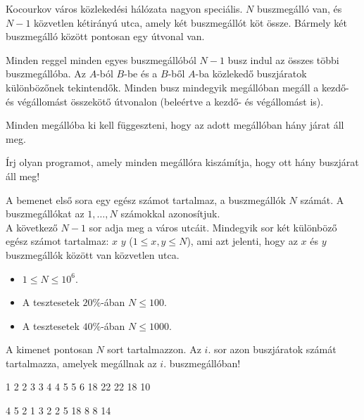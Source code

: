 





Kocourkov város közlekedési hálózata nagyon speciális. $N$ buszmegálló van, és $N-1$ közvetlen kétirányú utca, amely két buszmegállót köt össze. Bármely két buszmegálló között pontosan egy útvonal van.

Minden reggel minden egyes buszmegállóból $N-1$ busz indul az összes többi buszmegállóba. Az $A$-ból $B$-be és a $B$-ből $A$-ba közlekedő buszjáratok különbözőnek tekintendők. Minden busz mindegyik megállóban megáll a kezdő- és végállomást összekötő útvonalon (beleértve a kezdő- és végállomást is).

Minden megállóba ki kell függeszteni, hogy az adott megállóban hány járat áll meg.


Írj olyan programot, amely minden megállóra kiszámítja, hogy ott hány buszjárat áll meg!


A bemenet első sora egy egész számot tartalmaz, a buszmegállók $N$ számát. A buszmegállókat az $1,\ldots,N$ számokkal azonosítjuk.\\
A következő $N-1$ sor adja meg a város utcáit. Mindegyik sor két különböző egész számot tartalmaz: $x \,\, y$  ($1 \le x, y \le N$), ami azt jelenti, hogy az $x$ és $y$ buszmegállók között van közvetlen utca.

\begin{itemize}\itemsep -5pt
\item $1 \leq N \leq 10^6$.\\
\item A tesztesetek $20\%$-ában  $N \leq 100$.\\
\item A tesztesetek $40\%$-ában $N \leq 1000$.
\end{itemize}

A kimenet pontosan $N$ sort tartalmazzon. Az $i$. sor azon buszjáratok számát tartalmazza, amelyek megállnak az $i$. buszmegállóban!


1 2
2 3
3 4
4 5
5 6
18
22
22
18
10
\sampleEND

\bigskip

4 5
2 1
3 2
2 5
18
8
8
14
\sampleEND


